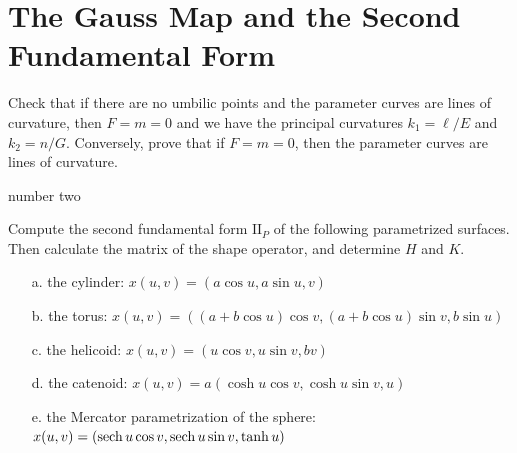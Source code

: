 \documentclass[Shifrin_Solutions_Spring_2018]{subfiles}
\begin{document}
\section{The Gauss Map and the Second Fundamental Form}

\begin{exercise}
Check that if there are no umbilic points and the parameter curves are lines of curvature, then $F = m = 0$ and we have the principal curvatures $k_1 = \ell/E$ and $k_2 = n/G$. Conversely, prove that if $F =m =0$, then the parameter curves are lines of curvature.
\end{exercise}

\begin{exercise} number two

\end{exercise}

\begin{exercise} Compute the second fundamental form $\mathrm{II}_P$ of the following parametrized surfaces. Then calculate the matrix of the shape operator, and determine $H$ and $K$.
\begin{itemize}
\item[a.] the cylinder: $x(u,v) = \left( a \cos u , a \sin u , v \right) $
\item[b.] the torus: $x(u,v) = \left ( (a+b\cos u) \cos v, (a+b\cos u) \sin v , b \sin u \right) $
\item[c.] the helicoid: $x(u,v) = \left( u\cos v , u \sin v , b v \right) $
\item[d.] the catenoid: $x(u,v) = a\left( \cosh u \cos v, \cosh u\sin v, u \right) $
\item[e.] the Mercator parametrization of the sphere: $x(u,v) = \left( \operatorname{\mathrm{sech}} u \cos v , \operatorname{\mathrm{sech}} u \sin v, \tanh u \right) $
\end{itemize}
\end{exercise}
\end{document}
